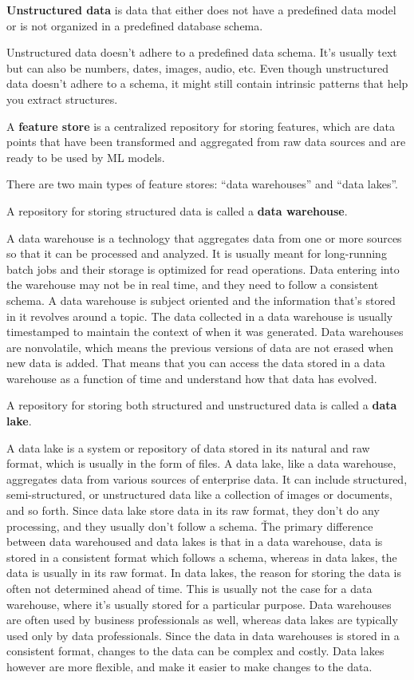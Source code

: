 \textbf{Unstructured data} is data that either does not have a predefined data model or is not organized in a predefined
database schema.
\ed

Unstructured data doesn't adhere to a predefined data schema. It's usually text but can also be numbers, dates,
images, audio, etc. Even though unstructured data doesn't adhere to a schema, it might still contain intrinsic
patterns that help you extract structures.

A \textbf{feature store} is a centralized repository for storing features, which are data points that have been
transformed and aggregated from raw data sources and are ready to be used by ML models.
\ed

There are two main types of feature stores: ``data warehouses'' and ``data lakes''.

A repository for storing structured data is called a \textbf{data warehouse}.
\ed

A data warehouse is a technology that aggregates data from one or more sources so that it can be processed and
analyzed. It is usually meant for long-running batch jobs and their storage is optimized for read operations. Data
entering into the warehouse may not be in real time, and they need to follow a consistent schema. A data warehouse is
subject oriented and the information that's stored in it revolves around a topic. The data collected in a data
warehouse is usually timestamped to maintain the context of when it was generated. Data warehouses are nonvolatile,
which means the previous versions of data are not erased when new data is added. That means that you can access the
data stored in a data warehouse as a function of time and understand how that data has evolved.

A repository for storing both structured and unstructured data is called a \textbf{data lake}.
\ed

A data lake is a system or repository of data stored in its natural and raw format, which is usually in the form of
files. A data lake, like a data warehouse, aggregates data from various sources of enterprise data. It can include
structured, semi-structured, or unstructured data like a collection of images or documents, and so forth. Since data
lake store data in its raw format, they don't do any processing, and they usually don't follow a schema. \v

The primary difference between data warehoused and data lakes is that in a data warehouse, data is stored in a
consistent format which follows a schema, whereas in data lakes, the data is usually in its raw format. In data lakes,
the reason for storing the data is often not determined ahead of time. This is usually not the case for a data
warehouse, where it's usually stored for a particular purpose. Data warehouses are often used by business
professionals as well, whereas data lakes are typically used only by data professionals. Since the data in data
warehouses is stored in a consistent format, changes to the data can be complex and costly. Data lakes however are
more flexible, and make it easier to make changes to the data.

